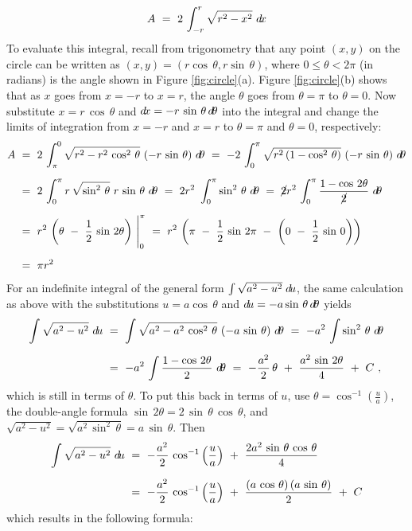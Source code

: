 \[
A ~=~ 2 \, \int_{-r}^{r} \sqrt{r^2 - x^2}~d\!x
\]
To evaluate this integral, recall from trigonometry that any point $(x,y)$ on
the circle can be written as $(x,y)=(r\cos\,\theta,r\sin\,\theta)$, where
$0 \le \theta < 2\pi$ (in radians) is the angle shown in Figure
\ref{fig:circle}(a). Figure \ref{fig:circle}(b) shows that as $x$ goes from
$x=-r$ to $x=r$, the angle $\theta$ goes from $\theta = \pi$ to $\theta = 0$.
Now substitute $x=r\,\cos\,\theta$ and $d\!x=-r\,\sin\,\theta\,d\!\theta$ into the
integral and change the limits of integration from $x=-r$ and $x=r$ to $\theta
=\pi$ and $\theta=0$, respectively:
\begin{align*}
A ~&=~ 2 \,\int_{\pi}^{0} \sqrt{r^2 - r^2\,\cos^2 \,\theta}~(-r\,\sin\,\theta)~d\!\theta
  ~=~  -2 \,\int_{0}^{\pi} \sqrt{r^2\,(1 - \cos^2 \,\theta)}~(-r\,\sin\,\theta)~d\!\theta\\[6pt]
&=~ 2 \,\int_{0}^{\pi} r\,\sqrt{\sin^2\,\theta}~r\,\sin\,\theta~d\!\theta
  ~=~ 2r^2 \,\,\int_{0}^{\pi} \sin^2\,\theta~d\!\theta
  ~=~ \cancel{2}r^2 \,\int_{0}^{\pi} \frac{1 - \cos\,2\theta}{\cancel{2}}~d\!\theta\\[6pt]
&=~ r^2 \,\left(\theta ~-~ \frac{1}{2}\,\sin\,2\theta\right)~\Biggr|_0^{\pi}
  ~=~ r^2 \,\left(\pi ~-~ \frac{1}{2}\,\sin\,2\pi ~-~ \left(0
      ~-~ \frac{1}{2}\,\sin\,0\right)\right)\\[6pt]
&=~ \pi r^2 \quad\relax
\end{align*}
\newpage
For an indefinite integral of the general form $\int \sqrt{a^2 - u^2}\;d\!u$, the
same calculation as above with the substitutions $u=a \cos\,\theta$ and
$d\!u=-a \sin\,\theta\,d\!\theta$ yields
\begin{align*}
\int \sqrt{a^2 - u^2}~d\!u ~&=~ \int \sqrt{a^2 - a^2\,\cos^2 \,\theta}~(-a\,\sin\,\theta)~d\!\theta
 ~=~ -a^2 \,\int \sin^2\,\theta~d\!\theta\\[6pt]
&=~ -a^2 \,\int \frac{1 - \cos\,2\theta}{2}~d\!\theta
 ~=~ -\frac{a^2}{2}\,\theta ~+~ \frac{a^2\,\sin\,2\theta}{4} ~+~ C ~,
\end{align*}
which is still in terms of $\theta$. To put this back in terms of $u$, use
$\theta = \cos^{-1} (\frac{u}{a})$, the double-angle formula
$\sin\,2\theta = 2\,\sin\,\theta\,\cos\,\theta$, and
$\sqrt{a^2 - u^2} = \sqrt{a^2\,\sin^2\,\theta} = a\,\sin\,\theta$. Then
\begin{align*}
\int \sqrt{a^2 - u^2}~d\!u ~&=~ -\frac{a^2}{2}\,\cos^{-1} \left(\frac{u}{a}\right) ~+~
   \frac{2a^2\,\sin\,\theta\,\cos\,\theta}{4}\\[6pt]
&=~ -\frac{a^2}{2}\,\cos^{-1} \left(\frac{u}{a}\right) ~+~
   \frac{(a\,\cos\,\theta)\,(a\,\sin\,\theta)}{2} ~+~ C 
\end{align*}
which results in the following formula:


